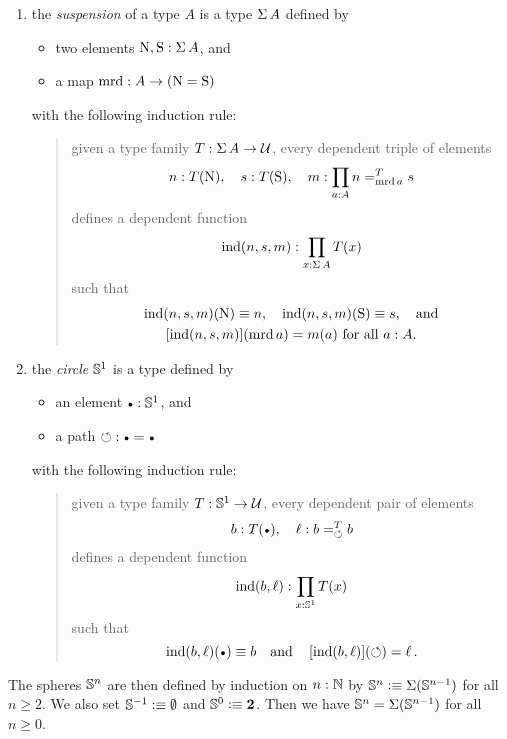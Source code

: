 \documentclass[english,a4paper]{lmcs}
\begin{document}
\begin{enumerate}
\item the \emph{suspension} of a type $A$ is a type $\operatorname{\Sigma} A$ defined
  by
  \begin{itemize}
  \item two elements $\mathrm{N},\mathrm{S}: \operatorname{\Sigma} A$, and
  \item a  map $\operatorname{\mathrm{mrd}} : A \to (\mathrm{N}=\mathrm{S})$
  \end{itemize}
  with the following induction rule:
  \begin{quote}
    given a type family $T: \operatorname{\Sigma} A \to \mathcal{U}$, every dependent
    triple of elements
    \begin{displaymath}
      n: T(\mathrm{N}), \quad s: T(\mathrm{S}),\quad
      m: \prod_{a: A}n =^{T}_{\operatorname{\mathrm{mrd}} a} s
    \end{displaymath}
    defines a dependent function
    \begin{displaymath}
      \operatorname{\mathrm{ind}}(n,s,m):\prod_{x: \operatorname{\Sigma} A} T(x)
    \end{displaymath}
    such that
    \begin{gather*}
      \operatorname{\mathrm{ind}}(n,s,m)(\mathrm{N}) \equiv n,\quad
      \operatorname{\mathrm{ind}}(n,s,m)(\mathrm{S}) \equiv s,\quad\text{and} \\
      \mathop{\left[{\operatorname{\mathrm{ind}}(n,s,m)}\right]}(\operatorname{\mathrm{mrd}} a) = m(a)\ \text{for all $a: A.$}
    \end{gather*}
  \end{quote}
\item the \emph{circle} ${{\mathbb S^{1}}}$ is a type defined by
  \begin{itemize}
  \item an element $\base \from \Sc$, and
  \item a path $\Sloop: \base = \base$
  \end{itemize}
  with the following induction rule:
  \begin{quote}
    given a type family $T: {{\mathbb S^{1}}} \to \mathcal{U}$, every dependent pair of
    elements
    \begin{displaymath}
      b\from T(\base), \quad \ell\from \pathover b T \Sloop b
    \end{displaymath}
    defines a dependent function
    \begin{displaymath}
      \operatorname{\mathrm{ind}}(b,\ell):\prod_{x: {{\mathbb S^{1}}}} T(x)
    \end{displaymath}
    such that
    \begin{displaymath}
      \ind(b,\ell)(\base) \jdeq b\quad\text{and}
      \quad \ap{\ind(b,\ell)}(\Sloop) = \ell \,.
    \end{displaymath}
  \end{quote}
\end{enumerate}
The spheres ${\mathbb S^{n}}$ are then defined by induction on $n:\mathbb{N}$ by
${\mathbb S^{n}} \vcentcolon\equiv \operatorname{\Sigma}({\mathbb S^{n-1}})$ for all $n\geq 2$.
We also set ${\mathbb S^{-1}} \vcentcolon\equiv\emptyset$ and ${\mathbb S^{0}}\vcentcolon\equiv\mathbf{2}$.
Then we have ${\mathbb S^{n}} = \operatorname{\Sigma}({\mathbb S^{n-1}})$ for all $n\ge0$.
\end{document}
